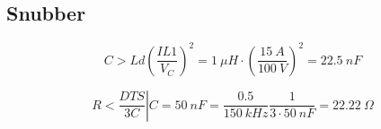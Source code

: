 %
%
%

\subsection{Snubber}

\begin{equation}
	C > Ld \left( \frac{I{L1}}{V_{C}} \right)^2 = 1 \ \mu H \cdot \left( \frac{15 \ A}{100 \ V} \right)^2 = 22.5 \ nF
\end{equation}

\begin{equation}
	R < \left. \frac{DTS}{3C} \right|{C = 50 \ nF} = \frac{0.5}{150 \ kHz} \frac{1}{3 \cdot 50 \ nF} = 22.22 \ \Omega
\end{equation}

%
